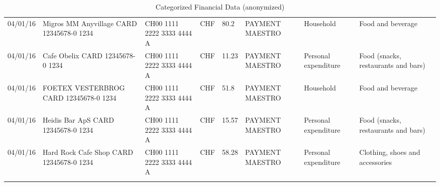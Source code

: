 \begin{landscape}
\begin{tiny}
\begin{longtable}{lp{4cm}llllp{3cm}ll}
		    04/01/16 & Migros MM Anyvillage CARD 12345678-0 1234 & CH00 1111 2222 3333 4444 A & CHF   & 80.2  & PAYMENT MAESTRO & Household & Food and beverage \\
		    04/01/16 & Cafe Obelix CARD 12345678-0 1234 & CH00 1111 2222 3333 4444 A & CHF   & 11.23 & PAYMENT MAESTRO & Personal expenditure & Food (snacks, restaurants and bars) \\
		    04/01/16 & FOETEX VESTERBROG CARD 12345678-0 1234 & CH00 1111 2222 3333 4444 A & CHF   & 51.8  & PAYMENT MAESTRO & Household & Food and beverage \\
		    04/01/16 & Heidis Bar ApS CARD 12345678-0 1234 & CH00 1111 2222 3333 4444 A & CHF   & 15.57 & PAYMENT MAESTRO & Personal expenditure & Food (snacks, restaurants and bars) \\
		    04/01/16 & Hard Rock Cafe Shop CARD 12345678-0 1234 & CH00 1111 2222 3333 4444 A & CHF   & 58.28 & PAYMENT MAESTRO & Personal expenditure & Clothing, shoes and accessories \\
	\caption{Categorized Financial Data (anonymized)}
	\label{tbl:catfinancialdata}
\end{longtable}%
\end{tiny}
\end{landscape}